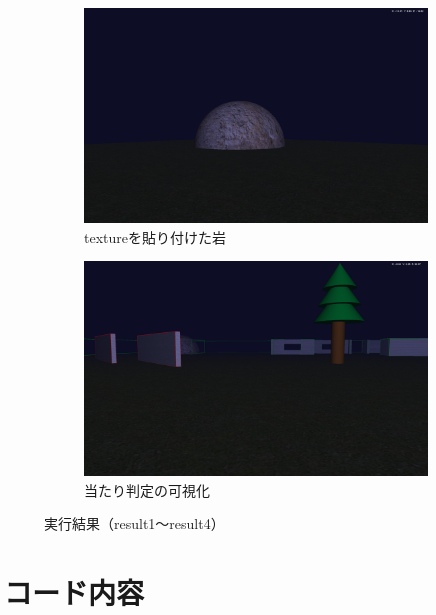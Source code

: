 \documentclass[uplatex,dvipdfmx,a4paper]{jsarticle}
\begin{document}
\begin{figure}[H]
    \begin{subfigure}[b]{0.48\linewidth}
        \includegraphics[width=\linewidth]{result3.png}
        \caption{textureを貼り付けた岩}
        \label{fig:result3}
    \end{subfigure}
    \hfill
    \begin{subfigure}[b]{0.48\linewidth}
        \includegraphics[width=\linewidth]{result4.png}
        \caption{当たり判定の可視化}
        \label{fig:result4}
    \end{subfigure}

    \caption{実行結果（result1〜result4）}
    \label{fig:results}
\end{figure}

\clearpage
\section{コード内容}
\end{document}
